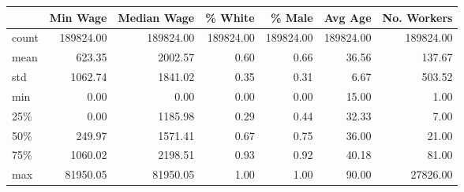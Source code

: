 \begin{tabular}{lrrrrrr}
\toprule
{} &  Min Wage &  Median Wage &   \% White &    \% Male &   Avg Age &  No. Workers \\
\midrule
count & 189824.00 &    189824.00 & 189824.00 & 189824.00 & 189824.00 &    189824.00 \\
mean  &    623.35 &      2002.57 &      0.60 &      0.66 &     36.56 &       137.67 \\
std   &   1062.74 &      1841.02 &      0.35 &      0.31 &      6.67 &       503.52 \\
min   &      0.00 &         0.00 &      0.00 &      0.00 &     15.00 &         1.00 \\
25\%   &      0.00 &      1185.98 &      0.29 &      0.44 &     32.33 &         7.00 \\
50\%   &    249.97 &      1571.41 &      0.67 &      0.75 &     36.00 &        21.00 \\
75\%   &   1060.02 &      2198.51 &      0.93 &      0.92 &     40.18 &        81.00 \\
max   &  81950.05 &     81950.05 &      1.00 &      1.00 &     90.00 &     27826.00 \\
\bottomrule
\end{tabular}
